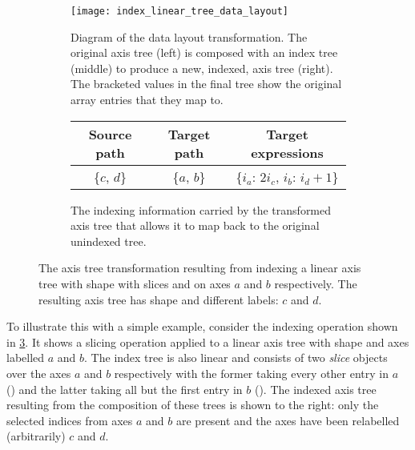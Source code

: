 \documentclass[thesis]{subfiles}
\begin{document}
\begin{figure}
  \centering
  \begin{subfigure}{\textwidth}
    \centering
    \texttt{[image: index\_linear\_tree\_data\_layout]}
    \caption{
      Diagram of the data layout transformation.
      The original axis tree (left) is composed with an index tree (middle) to produce a new, indexed, axis tree (right).
      The bracketed values in the final tree show the original array entries that they map to.
    }
    \label{fig:index_linear_tree_data_layout}
  \end{subfigure}

  \vspace{1em}

  \begin{subfigure}{\textwidth}
    \centering
    \begin{tabular}{|c|c|c|}
      \hline
      \textbf{Source path} & \textbf{Target path} & \textbf{Target expressions} \\
      \hline
      \{$c$, $d$\} & \{$a$, $b$\} & \{$i_a$: $2 i_c$, $i_b$: $i_d+1$\} \\
      \hline
    \end{tabular}
    \caption{
      The indexing information carried by the transformed axis tree that allows it to map back to the original unindexed tree.
    }
    \label{fig:index_linear_tree_exprs}
  \end{subfigure}

  \caption{
    The axis tree transformation resulting from indexing a linear axis tree with shape  with slices \pycode{[::2]} and \pycode{[1::]} on axes $a$ and $b$ respectively.
    The resulting axis tree has shape  and different labels: $c$ and $d$.
  }
  \label{fig:index_linear_tree_all}
\end{figure}

To illustrate this with a simple example, consider the indexing operation shown in \cref{fig:index_linear_tree_all}.
It shows a slicing operation applied to a linear axis tree with shape  and axes labelled $a$ and $b$.
The index tree is also linear and consists of two \textit{slice} objects over the axes $a$ and $b$ respectively with the former taking every other entry in $a$ (\pycode{[::2]}) and the latter taking all but the first entry in $b$ (\pycode{[1::]}).
The indexed axis tree resulting from the composition of these trees is shown to the right: only the selected indices from axes $a$ and $b$ are present and the axes have been relabelled (arbitrarily) $c$ and $d$.
\end{document}
